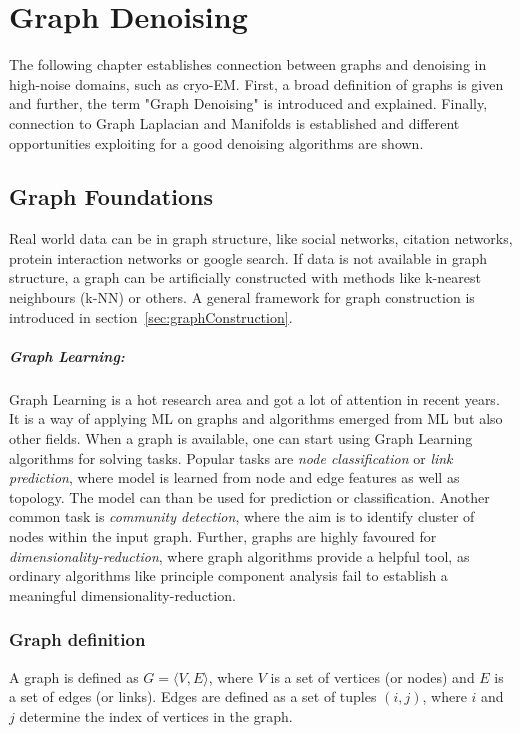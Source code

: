 \chapter{Graph Denoising}
\label{sec:graphFoundations}
    

The following chapter establishes connection between graphs and denoising in high-noise 
domains, such as cryo-EM.
First, a broad definition of graphs is given and further, the term "Graph Denoising" is
introduced and explained. Finally, connection to Graph Laplacian and Manifolds is established
and different opportunities exploiting for a good denoising algorithms are shown.

\section{Graph Foundations}
Real world data can be in graph structure, like social networks, citation networks,
protein interaction networks or google search. 
If data is not available in graph structure, a graph can be artificially constructed with methods like k-nearest neighbours (k-NN) or others.
A general framework for graph construction is introduced in section~\ref{sec:graphConstruction}.

\paragraph{Graph Learning:} Graph Learning is a hot research area and got a lot of attention in recent years.
It is a way of applying ML on graphs and algorithms emerged from ML but also other fields.
When a graph is available, one can start using Graph Learning algorithms for solving tasks.
Popular tasks are \textit{node classification} or \textit{link prediction}, where model is learned from node and edge features 
as well as topology. The model can than be used for prediction or classification.
Another common task is \textit{community detection}, where the aim is to identify cluster of nodes within the input graph.
Further, graphs are highly favoured for \textit{dimensionality-reduction}, where 
graph algorithms provide a helpful tool, as ordinary algorithms like principle component analysis fail to 
establish a meaningful dimensionality-reduction.

\subsection{Graph definition}
A graph is defined as $G = \langle V,E \rangle$, where $V$ is a set of 
vertices (or nodes) and $E$ is a set of edges (or links). 
Edges are defined as a set of tuples $(i, j)$, where $i$ and $j$ determine 
the index of vertices in the graph.

